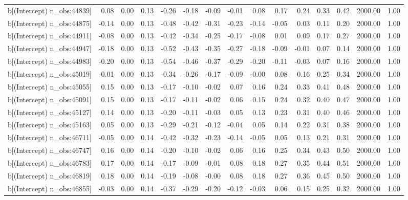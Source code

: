 \begin{table}[ht]
\begin{tabular}{rrrrrrrrrrrrrrr}
  b[(Intercept) n\_obs:44839] & 0.08 & 0.00 & 0.13 & -0.26 & -0.18 & -0.09 & -0.01 & 0.08 & 0.17 & 0.24 & 0.33 & 0.42 & 2000.00 & 1.00 \\ 
  b[(Intercept) n\_obs:44875] & -0.14 & 0.00 & 0.13 & -0.48 & -0.42 & -0.31 & -0.23 & -0.14 & -0.05 & 0.03 & 0.11 & 0.20 & 2000.00 & 1.00 \\ 
  b[(Intercept) n\_obs:44911] & -0.08 & 0.00 & 0.13 & -0.42 & -0.34 & -0.25 & -0.17 & -0.08 & 0.01 & 0.09 & 0.17 & 0.27 & 2000.00 & 1.00 \\ 
  b[(Intercept) n\_obs:44947] & -0.18 & 0.00 & 0.13 & -0.52 & -0.43 & -0.35 & -0.27 & -0.18 & -0.09 & -0.01 & 0.07 & 0.14 & 2000.00 & 1.00 \\ 
  b[(Intercept) n\_obs:44983] & -0.20 & 0.00 & 0.13 & -0.54 & -0.46 & -0.37 & -0.29 & -0.20 & -0.11 & -0.03 & 0.07 & 0.16 & 2000.00 & 1.00 \\ 
  b[(Intercept) n\_obs:45019] & -0.01 & 0.00 & 0.13 & -0.34 & -0.26 & -0.17 & -0.09 & -0.00 & 0.08 & 0.16 & 0.25 & 0.34 & 2000.00 & 1.00 \\ 
  b[(Intercept) n\_obs:45055] & 0.15 & 0.00 & 0.13 & -0.17 & -0.10 & -0.02 & 0.07 & 0.16 & 0.24 & 0.33 & 0.41 & 0.48 & 2000.00 & 1.00 \\ 
  b[(Intercept) n\_obs:45091] & 0.15 & 0.00 & 0.13 & -0.17 & -0.11 & -0.02 & 0.06 & 0.15 & 0.24 & 0.32 & 0.40 & 0.47 & 2000.00 & 1.00 \\ 
  b[(Intercept) n\_obs:45127] & 0.14 & 0.00 & 0.13 & -0.20 & -0.11 & -0.03 & 0.05 & 0.13 & 0.23 & 0.31 & 0.40 & 0.46 & 2000.00 & 1.00 \\ 
  b[(Intercept) n\_obs:45163] & 0.05 & 0.00 & 0.13 & -0.29 & -0.21 & -0.12 & -0.04 & 0.05 & 0.14 & 0.22 & 0.31 & 0.38 & 2000.00 & 1.00 \\ 
  b[(Intercept) n\_obs:46711] & -0.05 & 0.00 & 0.14 & -0.42 & -0.32 & -0.23 & -0.14 & -0.05 & 0.05 & 0.13 & 0.21 & 0.31 & 2000.00 & 1.00 \\ 
  b[(Intercept) n\_obs:46747] & 0.16 & 0.00 & 0.14 & -0.20 & -0.10 & -0.02 & 0.06 & 0.16 & 0.25 & 0.34 & 0.43 & 0.50 & 2000.00 & 1.00 \\ 
  b[(Intercept) n\_obs:46783] & 0.17 & 0.00 & 0.14 & -0.17 & -0.09 & -0.01 & 0.08 & 0.18 & 0.27 & 0.35 & 0.44 & 0.51 & 2000.00 & 1.00 \\ 
  b[(Intercept) n\_obs:46819] & 0.18 & 0.00 & 0.14 & -0.19 & -0.08 & -0.00 & 0.08 & 0.18 & 0.27 & 0.36 & 0.45 & 0.50 & 2000.00 & 1.00 \\ 
  b[(Intercept) n\_obs:46855] & -0.03 & 0.00 & 0.14 & -0.37 & -0.29 & -0.20 & -0.12 & -0.03 & 0.06 & 0.15 & 0.25 & 0.32 & 2000.00 & 1.00 \\ 

\end{tabular}
\end{table}
